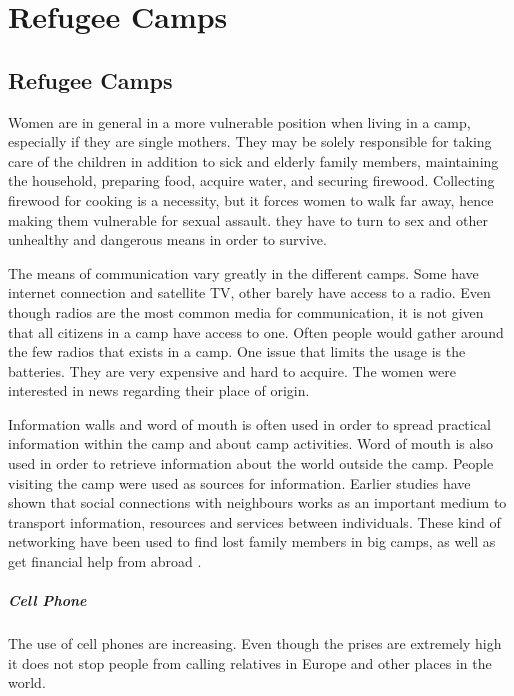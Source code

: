 \chapter{Refugee Camps}
\label{chp:refugeecamps} 



\section{Refugee Camps}

Women are in general in a more vulnerable position when living in a  camp, especially if they are single mothers. They may be solely responsible for taking care of the children in addition to sick and elderly family members, maintaining the household, preparing food, acquire water, and securing firewood. Collecting firewood for cooking is a necessity, but it forces women  to walk far away, hence making them vulnerable for sexual assault. they have to turn to sex and other unhealthy and dangerous means in order to survive. \cite{womenRefugee} 


The means of communication vary greatly in the different camps. Some have internet connection and satellite TV, other barely have access to a radio. Even though radios are the most common media for communication, it is not given that all citizens in a camp have access to one. Often people would gather around the few radios that exists in a camp. One issue that limits the usage is the batteries. They are very expensive and hard to acquire. The women were interested in news regarding their place of origin. 

Information walls and word of mouth is often used in order to spread practical information within the camp and about camp activities. Word of mouth is also used in order to retrieve information about the world outside the camp. People visiting the camp were used as sources for information. Earlier studies have shown that social connections with neighbours works as an important medium to transport information, resources and services between individuals. These kind of networking have been used to find lost family members in big camps, as well as get financial help from abroad \cite{womenRefugee}.  



\paragraph{Cell Phone}
The use of cell phones are increasing. Even though the prises are extremely high it does not stop people from calling relatives in Europe and other places in the world. 
\cite{womenRefugee} 

